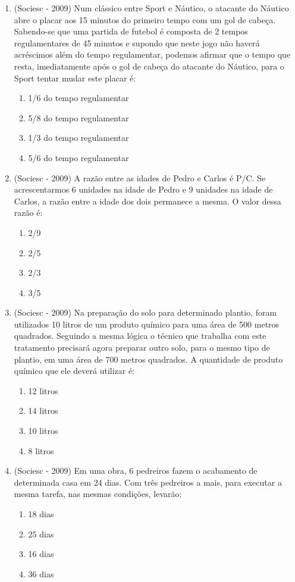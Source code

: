 \begin{enumerate}
    \item (Sociesc - 2009) Num clássico entre Sport e Náutico, o atacante do Náutico abre o placar aos 15 minutos do primeiro tempo com um gol de cabeça. Sabendo-se que uma partida de futebol é composta de 2 tempos regulamentares de 45 minutos e supondo que neste jogo não haverá acréscimos além do tempo regulamentar, podemos afirmar que o tempo que resta, imediatamente após o gol de cabeça do atacante do Náutico, para o Sport tentar mudar este placar é:
  \begin{enumerate}
  \item 1/6 do tempo regulamentar
  \item 5/8 do tempo regulamentar
  \item 1/3 do tempo regulamentar
  \item 5/6 do tempo regulamentar
 \end{enumerate}

 \item (Sociesc - 2009) A razão entre as idades de Pedro e Carlos é P/C. Se acrescentarmos 6 unidades na idade de Pedro e 9 unidades na idade de Carlos, a razão entre a idade dos dois permanece a mesma. O valor dessa razão é:
  \begin{enumerate}
  \item 2/9
  \item 2/5
  \item 2/3
  \item 3/5
 \end{enumerate}

  \item (Sociesc - 2009) Na preparação do solo para determinado plantio, foram utilizados 10 litros de um produto químico para uma área de 500 metros quadrados. Seguindo a mesma lógica o técnico que trabalha
 com este tratamento precisará agora preparar outro solo, para o mesmo tipo de plantio, em uma área de 700 metros quadrados. A quantidade de produto químico que ele deverá utilizar é:
 \begin{enumerate}
  \item 12 litros
  \item 14 litros
  \item 10 litros
  \item 8 litros
 \end{enumerate}

 \item (Sociesc - 2009) Em uma obra, 6 pedreiros fazem o acabamento de determinada casa em 24 dias. Com três pedreiros a mais, para executar a mesma tarefa, nas mesmas condições, levarão:
  \begin{enumerate}
  \item 18 dias
  \item 25 dias
  \item 16 dias
  \item 36 dias
 \end{enumerate}


\end{enumerate}
